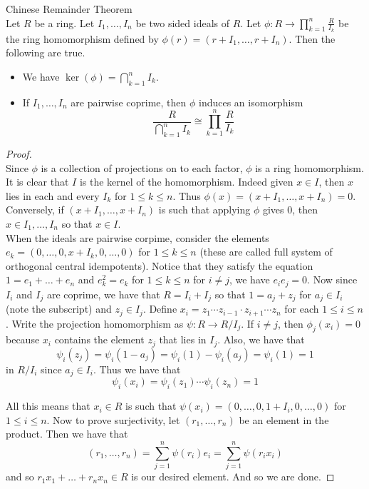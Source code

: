 \documentclass[a4paper]{article}
\begin{document}
\begin{thm}{Chinese Remainder Theorem}{}\\
Let $R$ be a ring. Let $I_1,\dots,I_n$ be two sided ideals of $R$. Let $\phi:R\to\prod_{k=1}^n\frac{R}{I_k}$ be the ring homomorphism defined by $\phi(r)=(r+I_1,\dots,r+I_n)$. Then the following are true. 
\begin{itemize}
\item We have $\ker(\phi)=\bigcap_{k=1}^nI_k$. 
\item If $I_1,\dots,I_n$ are pairwise coprime, then $\phi$ induces an isomorphism $$\frac{R}{\bigcap_{k=1}^nI_k}\cong\prod_{k=1}^n\frac{R}{I_k}$$
\end{itemize}
\begin{proof}\\
Since $\phi$ is a collection of projections on to each factor, $\phi$ is a ring homomorphism. It is clear that $I$ is the kernel of the homomorphism. Indeed given $x\in I$, then $x$ lies in each and every $I_k$ for $1\leq k\leq n$. Thus $\phi(x)=(x+I_1,\dots,x+I_n)=0$. Conversely, if $(x+I_1,\dots,x+I_n)$ is such that applying $\phi$ gives $0$, then $x\in I_1,\dots,I_n$ so that $x\in I$. \\

When the ideals are pairwise corpime, consider the elements $e_k=(0,\dots,0,x+I_k,0,\dots,0)$ for $1\leq k\leq n$ (these are called full system of orthogonal central idempotents). Notice that they satisfy the equation $1=e_1+\dots+e_n$ and $e_k^2=e_k$ for $1\leq k\leq n$ for $i\neq j$, we have $e_ie_j=0$. Now since $I_i$ and $I_j$ are coprime, we have that $R=I_i+I_j$ so that $1=a_j+z_j$ for $a_j\in I_i$ (note the subscript) and $z_j\in I_j$. Define $x_i=z_1\cdots z_{i-1}\cdot z_{i+1}\cdots z_n$ for each $1\leq i\leq n$. Write the projection homomorphism as $\psi:R\to R/I_j$. If $i\neq j$, then $\phi_j(x_i)=0$ because $x_i$ contains the element $z_j$ that lies in $I_j$. Also, we have that $$\psi_i(z_j)=\psi_i(1-a_j)=\psi_i(1)-\psi_i(a_j)=\psi_i(1)=1$$ in $R/I_i$ since $a_j\in I_i$. Thus we have that $$\psi_i(x_i)=\psi_i(z_1)\cdots\psi_i(z_n)=1$$

All this means that $x_i\in R$ is such that $\psi(x_i)=(0,\dots,0,1+I_i,0,\dots,0)$ for $1\leq i\leq n$. Now to prove surjectivity, let $(r_1,\dots,r_n)$ be an element in the product. Then we have that $$(r_1,\dots,r_n)=\sum_{j=1}^n\psi(r_i)e_i=\sum_{j=1}^n\psi(r_ix_i)$$ and so $r_1x_1+\dots+r_nx_n\in R$ is our desired element. And so we are done. 
\end{proof}
\end{thm}
\end{document}
